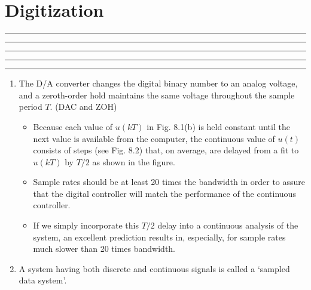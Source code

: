 \setcounter{chapter}{7}
\setcounter{section}{0}

%
\section{Digitization}
\vspace{-8pt} \hrule \hrule \hrule \hrule \hrule  \vspace{12pt}


\begin{enumerate}\addtocounter{enumi}{6}
 \item The D/A converter changes the digital binary number to an analog voltage, and a zeroth-order hold maintains the same voltage throughout the sample period $T$. (DAC and ZOH)

 \begin{itemize}
  \item Because each value of $u(kT)$ in Fig. 8.1(b) is held constant until the next value is available from the computer, the continuous value of $u(t)$ consists of steps (see Fig. 8.2) that, on average, are delayed from a fit to $u(kT)$ by $T/2$ as shown in the figure. 
  \item Sample rates should be at least 20 times the bandwidth in order to assure that the digital controller will match the performance of the continuous controller.
  \item If we simply incorporate this $T/2$ delay into a continuous analysis of the system, an excellent prediction results in, especially, for sample rates much slower than 20 times bandwidth.
 \end{itemize}
 \item A system having both discrete and continuous signals is called a `sampled data system'. 

\end{enumerate}

